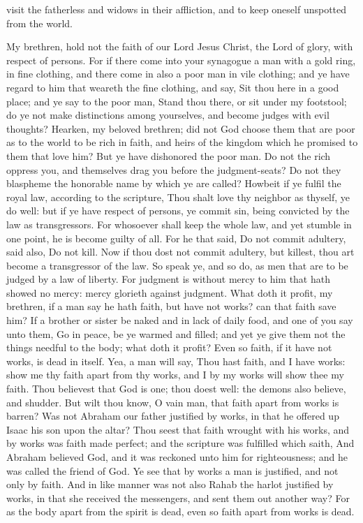 visit the fatherless and widows in their affliction, and to keep oneself unspotted from the world. 

My brethren, hold not the faith of our Lord Jesus Christ, the Lord of glory, with respect of persons. For if there come into your synagogue a man with a gold ring, in fine clothing, and there come in also a poor man in vile clothing; and ye have regard to him that weareth the fine clothing, and say, Sit thou here in a good place; and ye say to the poor man, Stand thou there, or sit under my footstool; do ye not make distinctions among yourselves, and become judges with evil thoughts? Hearken, my beloved brethren; did not God choose them that are poor as to the world to be rich in faith, and heirs of the kingdom which he promised to them that love him? But ye have dishonored the poor man. Do not the rich oppress you, and themselves drag you before the judgment-seats? Do not they blaspheme the honorable name by which ye are called? Howbeit if ye fulfil the royal law, according to the scripture, Thou shalt love thy neighbor as thyself, ye do well: but if ye have respect of persons, ye commit sin, being convicted by the law as transgressors. For whosoever shall keep the whole law, and yet stumble in one point, he is become guilty of all. For he that said, Do not commit adultery, said also, Do not kill. Now if thou dost not commit adultery, but killest, thou art become a transgressor of the law. So speak ye, and so do, as men that are to be judged by a law of liberty. For judgment is without mercy to him that hath showed no mercy: mercy glorieth against judgment.  What doth it profit, my brethren, if a man say he hath faith, but have not works? can that faith save him? If a brother or sister be naked and in lack of daily food, and one of you say unto them, Go in peace, be ye warmed and filled; and yet ye give them not the things needful to the body; what doth it profit? Even so faith, if it have not works, is dead in itself. Yea, a man will say, Thou hast faith, and I have works: show me thy faith apart from thy works, and I by my works will show thee my faith. Thou believest that God is one; thou doest well: the demons also believe, and shudder. But wilt thou know, O vain man, that faith apart from works is barren? Was not Abraham our father justified by works, in that he offered up Isaac his son upon the altar? Thou seest that faith wrought with his works, and by works was faith made perfect; and the scripture was fulfilled which saith, And Abraham believed God, and it was reckoned unto him for righteousness; and he was called the friend of God. Ye see that by works a man is justified, and not only by faith. And in like manner was not also Rahab the harlot justified by works, in that she received the messengers, and sent them out another way? For as the body apart from the spirit is dead, even so faith apart from works is dead. 

